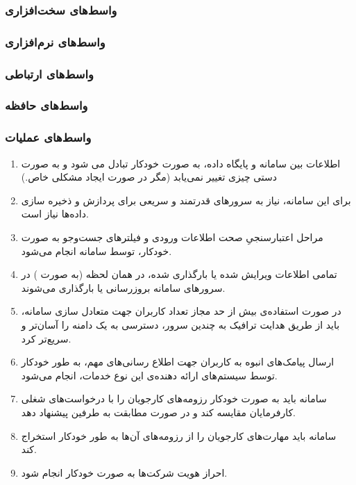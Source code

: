 \documentclass{report}
\begin{document}
				\subsubsection{واسط‌های سخت‌افزاری}
				\subsubsection{واسط‌های نرم‌افزاری} 
				\subsubsection{واسط‌های ارتباطی}
				\subsubsection{واسط‌های حافظه}
				\subsubsection{واسط‌های عملیات}
					\begin{enumerate}
						\item 
						اطلاعات بین سامانه و پایگاه داده، به صورت خودکار تبادل می شود و به صورت دستی چیزی تغییر نمی‌یابد (مگر در صورت ایجاد مشکلی خاص.)
						\item 
						برای این سامانه، نیاز به سرورهای قدرتمند و سریعی برای پردازش و ذخیره سازی داده‌ها نیاز است.
						\item 
						مراحل اعتبارسنجیِ صحت اطلاعات ورودی و فیلترهای جست‌و‌جو به صورت خودکار، توسط سامانه انجام می‌شود.
						\item 
						تمامی اطلاعات ویرایش شده یا بارگذاری شده، در همان لحظه 
						(به صورت  )
						 در سرور‌های سامانه بروزرسانی یا بارگذاری می‌شوند.
						\item 
						در صورت استفاده‌ی بیش از حد مجاز تعداد کاربران جهت متعادل سازی سامانه، باید از طریق هدایت ترافیک به چندین سرور، دسترسی به یک دامنه را آسان‌تر و سریع‌تر کرد.
						\item 
						ارسال پیامک‌های انبوه به کاربران جهت اطلاع رسانی‌های مهم، به طور خودکار توسط سیستم‌های ارائه دهنده‌ی این نوع خدمات، انجام می‌شود.
						\item 
						سامانه باید به صورت خودکار رزومه‌های کارجویان را با درخواست‌های شغلی کارفرمایان مقایسه کند و در صورت مطابقت به طرفین پیشنهاد دهد.
						\item 
						سامانه باید مهارت‌های کارجویان را از رزومه‌های آن‌ها به طور خودکار استخراج کند.
						\item 
						احراز هویت شرکت‌ها به صورت خودکار انجام شود.
					\end{enumerate}
\end{document}
